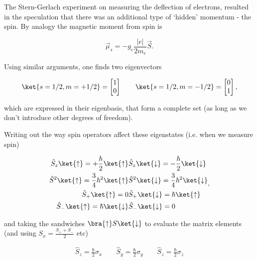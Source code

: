   The Stern-Gerlach experiment on measuring the deflection of electrons,
  resulted  in the  speculation that  there  was an  additional type  of
  `hidden' momentum - the spin. By analogy the magnetic moment from spin
  is

  \begin{equation}
    \vec{\mu}_s = -g_e\frac{|e|}{2m_e}\vec{S}.
    \label{eqn:gqmSpin}
  \end{equation}

  \noindent Using similar arguments, one finds two eigenvectors

  \begin{equation}
    \ket{s=1/2,m=+1/2} = \begin{bmatrix}
      1\\0
    \end{bmatrix}\qquad \ket{s=1/2,m=-1/2} = \begin{bmatrix}
      0 \\1
    \end{bmatrix},
  \end{equation}

  \noindent  which  are  expressed  in their  eigenbasis,  that  form  a
  complete set (as long as we don't introduce other degrees of freedom).


  Writing out the way spin operators affect these eigenstates (i.e. when
  we measure spin)

  \begin{equation}
    \begin{aligned}
      \hat{S}_z\ket{\uparrow} = +\frac{\hbar}{2}\ket{\uparrow} & \hat{S}_z\ket{\downarrow} = -\frac{\hbar}{2}\ket{\downarrow}\\
      \hat{S}^2\ket{\uparrow} = \frac{3}{4}\hbar^2\ket{\uparrow} & \hat{S}^2\ket{\downarrow} = \frac{3}{4}\hbar^2\ket{\downarrow}\\
      \hat{S}_+\ket{\uparrow} = 0 &
      \hat{S}_+\ket{\downarrow} = \hbar\ket{\uparrow}\\
      \hat{S}_-\ket{\uparrow} = \hbar\ket{\downarrow} &
      \hat{S}_-\ket{\downarrow} = 0\\
    \end{aligned},
  \end{equation}

  \noindent and taking the  sandwiches $\bra{\uparrow}S\ket{\downarrow}$ to evaluate the
  matrix elements (and using $S_x = \frac{S_++S_-}{2}$ etc)

  \begin{equation}
    \begin{aligned}
      \hat{S}_z = \frac{\hbar}{2}\sigma_x  \qquad \hat{S}_y = \frac{\hbar}{2}\sigma_y
      \qquad \hat{S}_z = \frac{\hbar}{2}\sigma_z
    \end{aligned}
    \label{eqn:gqmPauli}
  \end{equation}

